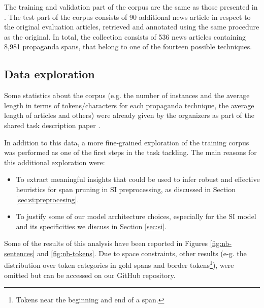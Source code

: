 \documentclass[11pt]{article}
\newcommand{\pol}[1]{{\fontfamily{pcr}\selectfont#1}}
\begin{document}
The training and validation part of the corpus are the same as those presented in \cite{da-san-martino-etal-2019-fine}. The test part of the corpus consists of 90 additional news article in respect to the original evaluation articles, retrieved and annotated using the same procedure as the original. In total, the collection consists of 536 news articles containing 8,981 propaganda spans, that belong to one of the fourteen possible techniques.

\subsection{Data exploration}
Some statistics about the corpus (e.g. the number of instances and the average length in terms of tokens/characters for each propaganda technique, the average length of articles and others) were already given by the organizers as part of the shared task description paper \cite{semeval}.

In addition to this data, a more fine-grained exploration of the training corpus was performed as one of the first steps in the task tackling. The main reasons for this additional exploration were:
\begin{itemize}
    \item To extract meaningful insights that could be used to infer robust and effective heuristics for span pruning in \pol{SI} preprocessing, as discussed in Section \ref{sec:si:preprocesing}.
    \item To justify some of our model architecture choices, especially for the \pol{SI} model and its specificities we discuss in Section \ref{sec:si}.
\end{itemize}

Some of the results of this analysis have been reported in Figures \ref{fig:nb-sentences} and \ref{fig:nb-tokens}. Due to space constraints, other results (e-g. the distribution over token categories in gold spans and border tokens\footnote{Tokens near the beginning and end of a span.}), were omitted but can be accessed on our GitHub repository.

\end{document}
